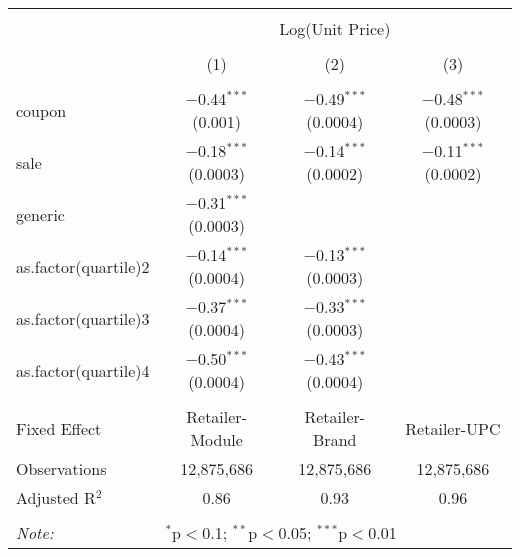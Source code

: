 
\begin{table}[!htbp] \centering 
  \caption{} 
  \label{tab:overallSavingsNonStorable} 
\begin{tabular}{@{\extracolsep{5pt}}lccc} 
\\[-1.8ex]\hline 
\hline \\[-1.8ex] 
 & \multicolumn{3}{c}{Log(Unit Price)} \\ 
\\[-1.8ex] & (1) & (2) & (3)\\ 
\hline \\[-1.8ex] 
 coupon & $-$0.44$^{***}$ (0.001) & $-$0.49$^{***}$ (0.0004) & $-$0.48$^{***}$ (0.0003) \\ 
  sale & $-$0.18$^{***}$ (0.0003) & $-$0.14$^{***}$ (0.0002) & $-$0.11$^{***}$ (0.0002) \\ 
  generic & $-$0.31$^{***}$ (0.0003) &  &  \\ 
  as.factor(quartile)2 & $-$0.14$^{***}$ (0.0004) & $-$0.13$^{***}$ (0.0003) &  \\ 
  as.factor(quartile)3 & $-$0.37$^{***}$ (0.0004) & $-$0.33$^{***}$ (0.0003) &  \\ 
  as.factor(quartile)4 & $-$0.50$^{***}$ (0.0004) & $-$0.43$^{***}$ (0.0004) &  \\ 
 \hline \\[-1.8ex] 
Fixed Effect & Retailer-Module & Retailer-Brand & Retailer-UPC \\ 
Observations & 12,875,686 & 12,875,686 & 12,875,686 \\ 
Adjusted R$^{2}$ & 0.86 & 0.93 & 0.96 \\ 
\hline 
\hline \\[-1.8ex] 
\textit{Note:}  & \multicolumn{3}{l}{$^{*}$p$<$0.1; $^{**}$p$<$0.05; $^{***}$p$<$0.01} \\ 
\end{tabular} 
\end{table} 
